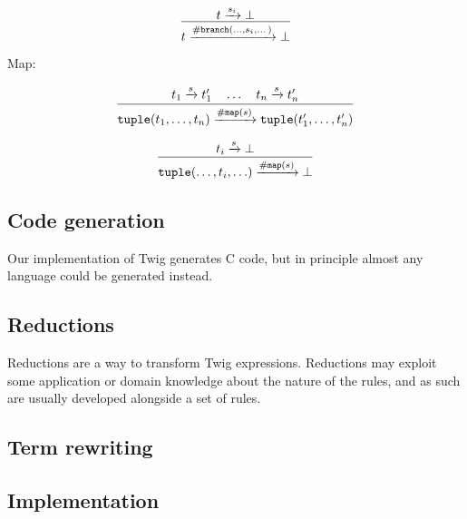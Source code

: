 \[
\infer
{t \arr{\mathtt{\#branch}(\ldots,s_i,\dots)} \bot}
{t \arr{s_i} \bot}
\]

Map:

\[
\infer{
  \mathtt{tuple}(t_1,\ldots,t_n)
  \arr{\mathtt{\#map}(s)}
  \mathtt{tuple}(t_1',\ldots,t_n')
}{t_1 \arr{s} t_1' \quad \ldots \quad t_n \arr{s} t_n'}
\]

\[
\infer
{\mathtt{tuple}(\ldots,t_i,\ldots) \arr{\mathtt{\#map}(s)} \bot}
{t_i \arr{s} \bot}
\]

\subsection{Code generation}

Our implementation of Twig generates C code, but in principle almost any
language could be generated instead.

\subsection{Reductions}

Reductions are a way to transform Twig expressions. Reductions may exploit
some application or domain knowledge about the nature of the rules, and as
such are usually developed alongside a set of rules.


\subsection{Term rewriting}
\label{section:term-rewriting}


\subsection{Implementation}

